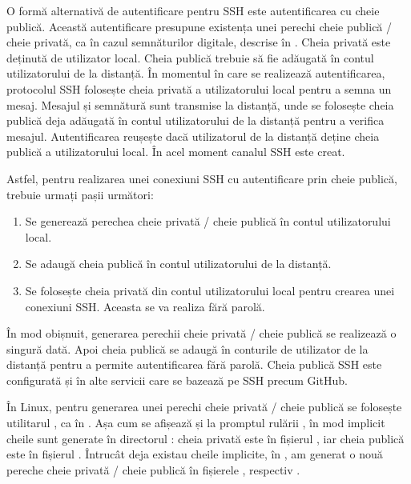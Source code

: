 O formă alternativă de autentificare pentru SSH este autentificarea cu cheie publică.
Această autentificare presupune existența unei perechi cheie publică / cheie privată, ca în cazul semnăturilor digitale, descrise în .
Cheia privată este deținută de utilizator local.
Cheia publică trebuie să fie adăugată în contul utilizatorului de la distanță.
În momentul în care se realizează autentificarea, protocolul SSH folosește cheia privată a utilizatorului local pentru a semna un mesaj. Mesajul și semnătură sunt transmise la distanță, unde se folosește cheia publică deja adăugată în contul utilizatorului de la distanță pentru a verifica mesajul.
Autentificarea reușește dacă utilizatorul de la distanță deține cheia publică a utilizatorului local.
În acel moment canalul SSH este creat.

Astfel, pentru realizarea unei conexiuni SSH cu autentificare prin cheie publică, trebuie urmați pașii următori:
\begin{enumerate}
  \item Se generează perechea cheie privată / cheie publică în contul utilizatorului local.
  \item Se adaugă cheia publică în contul utilizatorului de la distanță.
  \item Se folosește cheia privată din contul utilizatorului local pentru crearea unei conexiuni SSH. Aceasta se va realiza fără parolă.
\end{enumerate}

În mod obișnuit, generarea perechii cheie privată / cheie publică se realizează o singură dată.
Apoi cheia publică se adaugă în conturile de utilizator de la distanță pentru a permite autentificarea fără parolă.
Cheia publică SSH este configurată și în alte servicii care se bazează pe SSH precum GitHub.

În Linux, pentru generarea unei perechi cheie privată / cheie publică se folosește utilitarul , ca în .
Așa cum se afișează și la promptul rulării , în mod implicit cheile sunt generate în directorul : cheia privată este în fișierul , iar cheia publică este în fișierul .
Întrucât deja existau cheile implicite, în , am generat o nouă pereche cheie privată / cheie publică în fișierele , respectiv .

